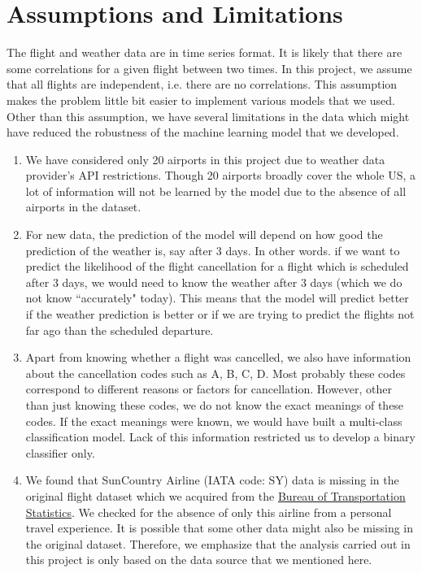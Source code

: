 \documentclass[12pt]{article}
\begin{document}
\section{Assumptions and Limitations}
\label{sec:limit}
The flight and weather data are in time series format. It is likely that there are some correlations for a given flight between two times. In this project, we assume that all flights are independent, i.e. there are no correlations. This assumption makes the problem little bit easier to implement various models that we used. Other than this assumption, we have several limitations in the data which might have reduced the robustness of the machine learning model that we developed.
\begin{enumerate}
\itemsep0em
\item We have considered only 20 airports in this project due to weather data provider's API restrictions. Though 20 airports broadly cover the whole US, a lot of information will not be learned by the model due to the absence of all airports in the dataset. 
\item For new data, the prediction of the model will depend on how good the prediction of the weather is, say after 3 days. In other words. if we want to predict the likelihood of the flight cancellation for a flight which is scheduled after 3 days, we would need to know the weather after 3 days (which we do not know ``accurately" today). This means that the model will predict better if the weather prediction is better or if we are trying to predict the flights not far ago than the scheduled departure.
\item Apart from knowing whether a flight was cancelled, we also have information about the cancellation codes such as A, B, C, D. Most probably these codes correspond to different reasons or factors for cancellation. However, other than just knowing these codes, we do not know the exact meanings of these codes. If the exact meanings were known, we would have built a multi-class classification model. Lack of this information restricted us to develop a binary classifier only.  
\item We found that SunCountry Airline (IATA code: SY) data is missing in the original flight dataset which we acquired from the \href{https://www.transtats.bts.gov/DL_SelectFields.asp?Table_ID=236&DB_Short_Name=On-Time}{Bureau of Transportation Statistics}. We checked for the absence of only this airline from a personal travel experience. It is possible that some other data might also be missing in the original dataset. Therefore, we emphasize that the analysis carried out in this project is only based on the data source that we mentioned here. 
\end{enumerate}
\end{document}
